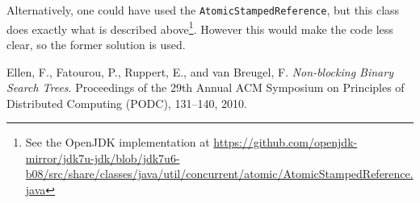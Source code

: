 \documentclass[a4paper,draft,12pt]{article}
\begin{document}
Alternatively, one could have used the \texttt{AtomicStampedReference}, but this class does exactly what is described above\footnote{See the OpenJDK implementation at \url{https://github.com/openjdk-mirror/jdk7u-jdk/blob/jdk7u6-b08/src/share/classes/java/util/concurrent/atomic/AtomicStampedReference.java}}. However this would make the code less clear, so the former solution is used.


\begin{thebibliography}{9}
     Ellen, F., Fatourou, P., Ruppert, E., and van Breugel, F. \emph{Non-blocking Binary Search Trees}. Proceedings of the 29th Annual ACM Symposium on Principles of Distributed Computing (PODC), 131–140, 2010.
\end{thebibliography}
\end{document}
